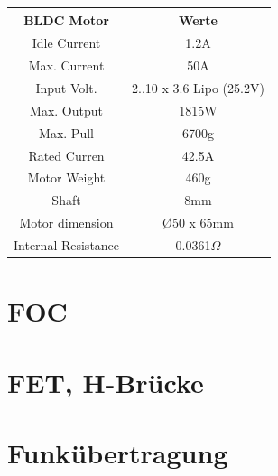 \begin{center}
	\begin{tabular}{|c|c|}
		\hline 
		\rule[-1ex]{0pt}{2.5ex}  BLDC Motor & Werte  \\ 
		\hline 
		\rule[-1ex]{0pt}{2.5ex} Idle Current & 1.2A \\ 
		\hline 
		\rule[-1ex]{0pt}{2.5ex} Max. Current & 50A \\ 
		\hline
		\rule[-1ex]{0pt}{2.5ex} Input Volt. & 2..10 x 3.6 Lipo (25.2V) \\ 
		\hline
		\rule[-1ex]{0pt}{2.5ex} Max. Output & 1815W \\ 
		\hline
		\rule[-1ex]{0pt}{2.5ex} Max. Pull & 6700g \\ 
		\hline
		\rule[-1ex]{0pt}{2.5ex} Rated Curren & 42.5A \\ 
		\hline
		\rule[-1ex]{0pt}{2.5ex} Motor Weight & 460g \\ 
		\hline
		\rule[-1ex]{0pt}{2.5ex} Shaft & 8mm \\ 
		\hline
		\rule[-1ex]{0pt}{2.5ex} Motor dimension & \O 50 x 65mm \\ 
		\hline
		\rule[-1ex]{0pt}{2.5ex} Internal Resistance & 0.0361$\Omega$ \\ 
		\hline	
	\end{tabular} 
	\label{tabBLDCdaten}
\end{center}






\section{FOC}
\label{tGl_FOC}


\section{FET, H-Brücke}
\label{tGl_HBrugg}
\section{Funkübertragung}
\label{tGl_RF}
